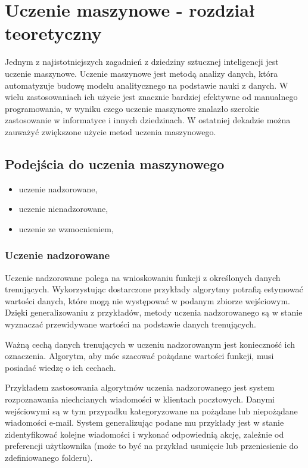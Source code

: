 \chapter{Uczenie maszynowe - rozdział teoretyczny}
\label{cha:ogolnyrozdzialteoretyczny}

Jednym z najistotniejszych zagadnień z dziedziny sztucznej inteligencji jest uczenie maszynowe. 
Uczenie maszynowe jest metodą analizy danych, która automatyzuje budowę modelu analitycznego na podstawie nauki z 
danych. W wielu zastosowaniach ich użycie jest znacznie bardziej efektywne od manualnego programowania, w wyniku czego 
uczenie maszynowe znalazło szerokie zastosowanie w informatyce i innych dziedzinach.
W ostatniej dekadzie można zauważyć zwiększone użycie metod uczenia maszynowego\cite{domingos2012few}.

\section{Podejścia do uczenia maszynowego}
\label{sec:podejsciadouczeniamaszynowego}

\begin{itemize}
 \item uczenie nadzorowane,
 \item uczenie nienadzorowane,
 \item uczenie ze wzmocnieniem,
\end{itemize}

\subsection{Uczenie nadzorowane}
\label{subsec:uczenienadzorowane}

Uczenie nadzorowane polega na wnioskowaniu funkcji z określonych danych trenujących.
Wykorzystując dostarczone przykłady algorytmy potrafią estymować wartości danych, które mogą nie występować w 
podanym zbiorze wejściowym. Dzięki generalizowaniu z przykładów, metody uczenia nadzorowanego są w stanie 
wyznaczać przewidywane wartości na podstawie danych trenujących.

Ważną cechą danych trenujących w uczeniu nadzorowanym jest konieczność ich oznaczenia. Algorytm, aby móc 
szacować pożądane wartości funkcji, musi posiadać wiedzę o ich cechach.

Przykładem zastosowania algorytmów uczenia nadzorowanego jest system rozpoznawania niechcianych wiadomości w klientach 
pocztowych. Danymi wejściowymi są w tym przypadku kategoryzowane na pożądane lub niepożądane wiadomości e-mail.
System generalizując podane mu przykłady jest w stanie zidentyfikować kolejne wiadomości i wykonać odpowiednią akcję, 
zależnie od preferencji użytkownika (może to być na przykład usunięcie lub przeniesienie do zdefiniowanego folderu).

